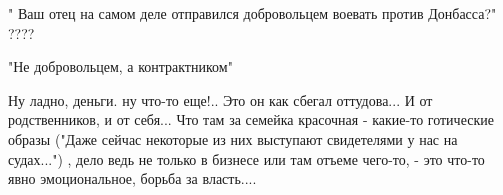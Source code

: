 \begin{itemize}
\begin{itemize}
" Ваш отец на самом деле отправился добровольцем воевать против Донбасса?" ????


"Не добровольцем, а контрактником"

Ну ладно, деньги. ну что-то еще!.. Это он как сбегал оттудова... И от
родственников, и от себя... Что там за семейка красочная - какие-то готические
образы ("Даже сейчас некоторые из них выступают свидетелями у нас на судах...")
, дело ведь не только в бизнесе или там отъеме чего-то, - это что-то явно
эмоциональное, борьба за власть....

\end{itemize} %

\end{itemize} %
